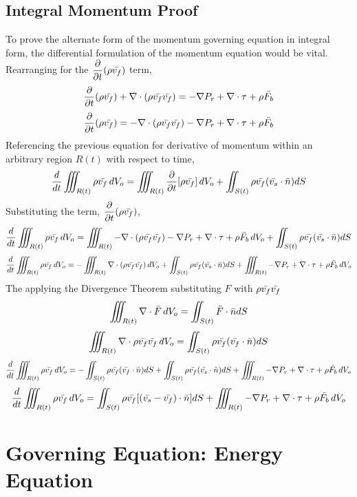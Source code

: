 \documentclass[class=report, 12pt, crop=false]{standalone}
\begin{document}
\begin{center}
\subsection{Integral Momentum Proof}
\begin{comment}
\end{comment}
To prove the alternate form of the momentum governing equation in integral form, the differential formulation of the momentum equation would be vital. Rearranging for the $\displaystyle{\frac{\partial}{\partial t} (\rho \bar{v_f})}$ term,
$$\frac{\partial}{\partial t} (\rho \bar{v_f}) + \nabla \cdot (\rho\bar{v_f}\bar{v_f}) = -\nabla P_r + \nabla \cdot \tau + \rho \bar{F_b}$$
$$\frac{\partial}{\partial t} (\rho \bar{v_f}) = - \nabla \cdot (\rho\bar{v_f}\bar{v_f}) -\nabla P_r + \nabla \cdot \tau + \rho \bar{F_b}$$
Referencing the previous equation for derivative of momentum within an arbitrary region $R(t)$ with respect to time,
$$\frac{d}{dt}\iiint_{R(t)}\rho \bar{v_f} \,dV_o = \iiint_{R(t)}\frac{\partial}{\partial t}[\rho \bar{v_f}]\,dV_o + \iint_{S(t)}\rho \bar{v_f}(\bar{v_s}\cdot\bar{n})dS$$
Substituting the term, $\displaystyle{\frac{\partial}{\partial t} (\rho \bar{v_f})}$,
$$\frac{d}{dt}\iiint_{R(t)}\rho \bar{v_f} \,dV_o = \iiint_{R(t)}- \nabla \cdot (\rho\bar{v_f}\bar{v_f}) -\nabla P_r + \nabla \cdot \tau + \rho \bar{F_b}\,dV_o + \iint_{S(t)}\rho \bar{v_f}(\bar{v_s}\cdot\bar{n})dS$$
$$\frac{d}{dt}\iiint_{R(t)}\rho \bar{v_f} \,dV_o = -\iiint_{R(t)} \nabla \cdot (\rho\bar{v_f}\bar{v_f})\,dV_o + \iint_{S(t)}\rho \bar{v_f}(\bar{v_s}\cdot\bar{n})dS + \iiint_{R(t)}-\nabla P_r + \nabla \cdot \tau + \rho \bar{F_b}\,dV_o$$
The applying the Divergence Theorem substituting $F$ with $\displaystyle{\rho\bar{v_f}\bar{v_f}}$
$$\iiint_{R(t)}  \nabla \cdot \bar{F} \,dV_o = \iint_{S(t)}\bar{F}\cdot \bar{n}dS$$
$$\iiint_{R(t)}  \nabla \cdot \rho\bar{v_f}\bar{v_f} \,dV_o = \iint_{S(t)}\rho\bar{v_f}(\bar{v_f}\cdot \bar{n})dS$$
$$\frac{d}{dt}\iiint_{R(t)}\rho \bar{v_f} \,dV_o = -\iint_{S(t)}\rho\bar{v_f}(\bar{v_f}\cdot \bar{n})dS + \iint_{S(t)}\rho \bar{v_f}(\bar{v_s}\cdot\bar{n})dS + \iiint_{R(t)}-\nabla P_r + \nabla \cdot \tau + \rho \bar{F_b}\,dV_o$$
$$\frac{d}{dt}\iiint_{R(t)}\rho \bar{v_f} \,dV_o = \iint_{S(t)}\rho \bar{v_f}[(\bar{v_s}-\bar{v_f})\cdot\bar{n}]dS + \iiint_{R(t)}-\nabla P_r + \nabla \cdot \tau + \rho \bar{F_b}\,dV_o$$
\section{Governing Equation: Energy Equation}
\begin{comment}
Governing Equation: Energy Equation
\end{comment}
\end{center}
\end{document}
